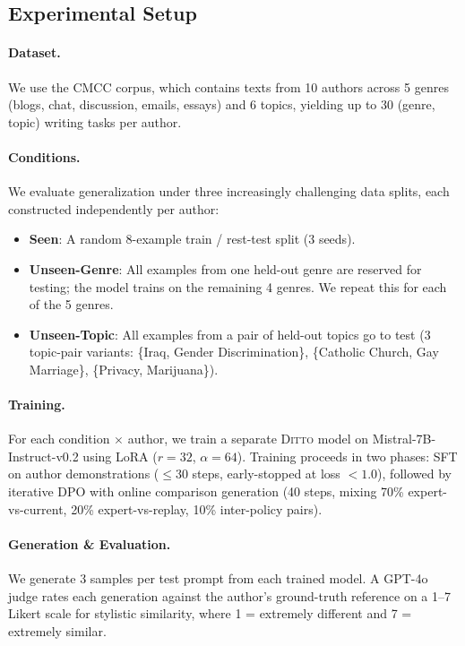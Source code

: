 \subsection{Experimental Setup}

\paragraph{Dataset.}
We use the CMCC corpus, which contains texts from 10 authors across 5 genres (blogs, chat, discussion, emails, essays) and 6 topics, yielding up to 30 (genre, topic) writing tasks per author.

\paragraph{Conditions.}
We evaluate generalization under three increasingly challenging data splits, each constructed independently per author:
\begin{itemize}
    \item \textbf{Seen}: A random 8-example train / rest-test split (3 seeds).
    \item \textbf{Unseen-Genre}: All examples from one held-out genre are reserved for testing; the model trains on the remaining 4 genres. We repeat this for each of the 5 genres.
    \item \textbf{Unseen-Topic}: All examples from a pair of held-out topics go to test (3 topic-pair variants: \{Iraq, Gender Discrimination\}, \{Catholic Church, Gay Marriage\}, \{Privacy, Marijuana\}).
\end{itemize}

\paragraph{Training.}
For each condition $\times$ author, we train a separate \textsc{Ditto} model on Mistral-7B-Instruct-v0.2 using LoRA ($r=32$, $\alpha=64$). Training proceeds in two phases: SFT on author demonstrations ($\leq$30 steps, early-stopped at loss $< 1.0$), followed by iterative DPO with online comparison generation (40 steps, mixing 70\% expert-vs-current, 20\% expert-vs-replay, 10\% inter-policy pairs).

\paragraph{Generation \& Evaluation.}
We generate 3 samples per test prompt from each trained model. A GPT-4o judge rates each generation against the author's ground-truth reference on a 1--7 Likert scale for stylistic similarity, where 1 = extremely different and 7 = extremely similar.
